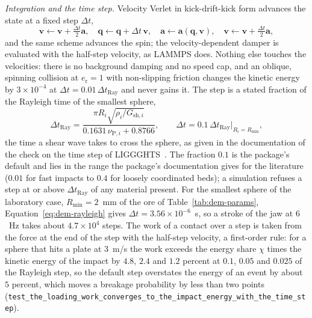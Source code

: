\emph{Integration and the time step.} Velocity Verlet in kick-drift-kick form advances the state at a fixed step $\Delta t$,
\begin{equation}
\mathbf v\leftarrow\mathbf v+\tfrac{\Delta t}{2}\mathbf a,\quad\mathbf q\leftarrow\mathbf q+\Delta t\,\mathbf v,\quad\mathbf a\leftarrow\mathbf a(\mathbf q,\mathbf v),\quad\mathbf v\leftarrow\mathbf v+\tfrac{\Delta t}{2}\mathbf a ,
\label{eq:dem-verlet}
\end{equation}
and the same scheme advances the spin; the velocity-dependent damper is evaluated with the half-step velocity, as LAMMPS does. Nothing else touches the
velocities: there is no background damping and no speed cap, and an oblique, spinning collision at $e_{\mathrm r}=1$ with non-slipping friction changes the kinetic
energy by $3\times10^{-4}$ at $\Delta t=0.01\,\Delta t_{\mathrm{Ray}}$ and never gains it. The step is a stated fraction of the Rayleigh time of the smallest sphere,
\begin{equation}
\Delta t_{\mathrm{Ray}}=\frac{\pi R_i\sqrt{\rho_i/G_{\mathrm{sh},i}}}{0.1631\,\nu_{\mathrm P,i}+0.8766},\qquad \Delta t = 0.1\,\Delta t_{\mathrm{Ray}}\big|_{R_i=R_{\min}} ,
\label{eq:dem-rayleigh}
\end{equation}
the time a shear wave takes to cross the sphere, as given in the documentation of the check on the time step of LIGGGHTS~\cite{cfdemtimestep}.
The fraction $0.1$ is the package's default and lies in the range the package's documentation gives for the literature ($0.01$ for fast impacts to $0.4$ for loosely coordinated beds); a simulation refuses a step at or above $\Delta t_{\mathrm{Ray}}$ of any material present. For the smallest sphere of the laboratory case, $R_{\min}=2$~mm of the ore
of Table~\ref{tab:dem-params}, Equation~\eqref{eq:dem-rayleigh} gives $\Delta t=3.56\times10^{-6}$~s, so a stroke of the jaw at $6$~Hz takes about $4.7\times10^{4}$ steps.
The work of a contact over a step is taken from the force at the end of the step with the half-step velocity, a first-order rule: for a sphere that hits a plate at
$3$~m/s the work exceeds the energy share $\chi$ times the kinetic energy of the impact by $4.8$, $2.4$ and $1.2$ percent at $0.1$, $0.05$ and $0.025$ of the Rayleigh step, so the default step overstates the
energy of an event by about $5$ percent, which moves a breakage probability by less than two points (\texttt{test\_the\_loading\_work\_converges\_to\_the\_impact\_energy\_with\_the\_time\_step}).

